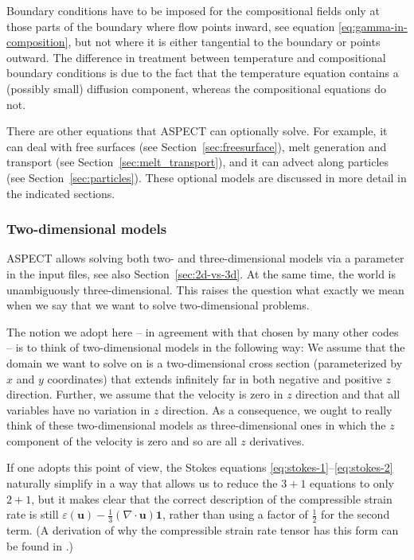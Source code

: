 \documentclass{article}
\newcommand{\aspect}{\textsc{ASPECT}}
\begin{document}
Boundary conditions have to be imposed for the compositional fields only
at those parts of the boundary where flow points inward, see equation
\eqref{eq:gamma-in-composition}, but not where it is either tangential
to the boundary or points outward. The difference in treatment between
temperature and compositional boundary conditions is due to the fact
that the temperature equation contains a (possibly small) diffusion
component, whereas the compositional equations do not.

There are other equations that \aspect{} can optionally solve. For example, it
can deal with free surfaces (see Section~\ref{sec:freesurface}), melt generation and
transport (see Section~\ref{sec:melt_transport}), and it can advect along
particles (see Section~\ref{sec:particles}). These optional models
are discussed in more detail in the indicated sections.


\subsubsection{Two-dimensional models}
\label{sec:meaning-of-2d}
\aspect{} allows solving both two- and three-dimensional
models via a parameter in the input files, see also Section~\ref{sec:2d-vs-3d}.
 
At the same time, the world is unambiguously three-dimensional. This raises the
question what exactly we mean when we say that we want to solve two-dimensional
problems.

The notion we adopt here -- in agreement with that chosen by many other codes --
is to think of two-dimensional models in the following way: We assume that the
domain we want to solve on is a two-dimensional cross section (parameterized by
$x$ and $y$ coordinates) that extends infinitely far in both negative and
positive $z$ direction. Further, we assume that the velocity is zero in $z$
direction and that all variables have no variation in $z$ direction. As a
consequence, we ought to really think of these two-dimensional models as
three-dimensional ones in which the $z$ component of the velocity is zero and so
are all $z$ derivatives.

If one adopts this point of view, the Stokes equations
\eqref{eq:stokes-1}--\eqref{eq:stokes-2} naturally simplify in a way that allows
us to reduce the $3+1$ equations to only $2+1$, but it makes clear that the
correct description of the compressible strain rate is still 
$\varepsilon(\mathbf u) - \frac{1}{3}(\nabla \cdot \mathbf u)\mathbf 1$, rather
than using a factor of $\frac{1}{2}$ for the second term. (A derivation of why
the compressible strain rate tensor has this form can be found in \cite[Section
6.5]{STO01}.)
\end{document}
